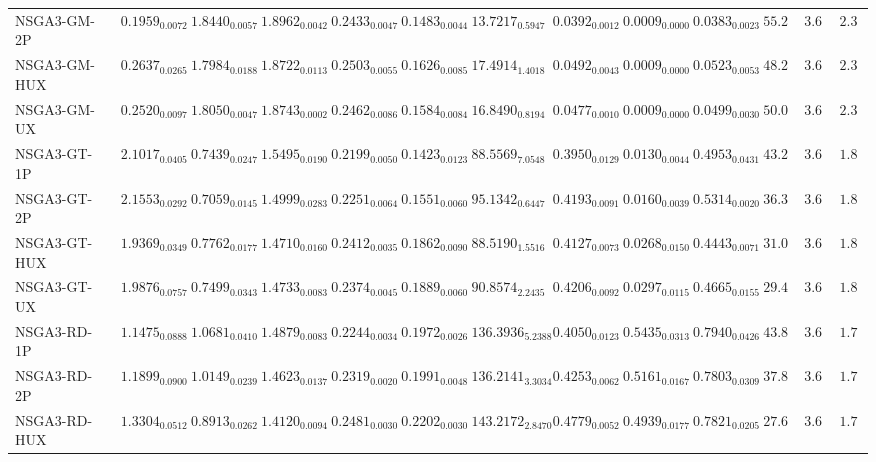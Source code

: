 \documentclass[11pt,a4paper]{article}
\begin{document}
\begin{table}[H]
{\begin{tabular}{lcccccccccccc}
NSGA3-GM-2P & $0.1959_{0.0072}$ & $1.8440_{0.0057}$ & $1.8962_{0.0042}$ & $0.2433_{0.0047}$ & $0.1483_{0.0044}$ & $13.7217_{0.5947}$ & $0.0392_{0.0012}$ & $0.0009_{0.0000}$ & $0.0383_{0.0023}$ & $55.22$ & $3.67$ & $2.33$ \\
NSGA3-GM-HUX & $0.2637_{0.0265}$ & $1.7984_{0.0188}$ & $1.8722_{0.0113}$ & $0.2503_{0.0055}$ & $0.1626_{0.0085}$ & $17.4914_{1.4018}$ & $0.0492_{0.0043}$ & $0.0009_{0.0000}$ & $0.0523_{0.0053}$ & $48.22$ & $3.67$ & $2.33$ \\
NSGA3-GM-UX & $0.2520_{0.0097}$ & $1.8050_{0.0047}$ & $1.8743_{0.0002}$ & $0.2462_{0.0086}$ & $0.1584_{0.0084}$ & $16.8490_{0.8194}$ & $0.0477_{0.0010}$ & $0.0009_{0.0000}$ & $0.0499_{0.0030}$ & $50.00$ & $3.67$ & $2.33$ \\
NSGA3-GT-1P & $2.1017_{0.0405}$ & $0.7439_{0.0247}$ & $1.5495_{0.0190}$ & $0.2199_{0.0050}$ & $0.1423_{0.0123}$ & $88.5569_{7.0548}$ & $0.3950_{0.0129}$ & $0.0130_{0.0044}$ & $0.4953_{0.0431}$ & $43.22$ & $3.67$ & $1.89$ \\
NSGA3-GT-2P & $2.1553_{0.0292}$ & $0.7059_{0.0145}$ & $1.4999_{0.0283}$ & $0.2251_{0.0064}$ & $0.1551_{0.0060}$ & $95.1342_{0.6447}$ & $0.4193_{0.0091}$ & $0.0160_{0.0039}$ & $0.5314_{0.0020}$ & $36.33$ & $3.67$ & $1.89$ \\
NSGA3-GT-HUX & $1.9369_{0.0349}$ & $0.7762_{0.0177}$ & $1.4710_{0.0160}$ & $0.2412_{0.0035}$ & $0.1862_{0.0090}$ & $88.5190_{1.5516}$ & $0.4127_{0.0073}$ & $0.0268_{0.0150}$ & $0.4443_{0.0071}$ & $31.00$ & $3.67$ & $1.89$ \\
NSGA3-GT-UX & $1.9876_{0.0757}$ & $0.7499_{0.0343}$ & $1.4733_{0.0083}$ & $0.2374_{0.0045}$ & $0.1889_{0.0060}$ & $90.8574_{2.2435}$ & $0.4206_{0.0092}$ & $0.0297_{0.0115}$ & $0.4665_{0.0155}$ & $29.44$ & $3.67$ & $1.89$ \\
NSGA3-RD-1P & $1.1475_{0.0888}$ & $1.0681_{0.0410}$ & $1.4879_{0.0083}$ & $0.2244_{0.0034}$ & $0.1972_{0.0026}$ & $136.3936_{5.2388}$ & $0.4050_{0.0123}$ & $0.5435_{0.0313}$ & $0.7940_{0.0426}$ & $43.89$ & $3.67$ & $\mathbf{1.78}$ \\
NSGA3-RD-2P & $1.1899_{0.0900}$ & $1.0149_{0.0239}$ & $1.4623_{0.0137}$ & $0.2319_{0.0020}$ & $0.1991_{0.0048}$ & $136.2141_{3.3034}$ & $0.4253_{0.0062}$ & $0.5161_{0.0167}$ & $0.7803_{0.0309}$ & $37.89$ & $3.67$ & $\mathbf{1.78}$ \\
NSGA3-RD-HUX & $1.3304_{0.0512}$ & $0.8913_{0.0262}$ & $\mathbf{1.4120}_{0.0094}$ & $0.2481_{0.0030}$ & $0.2202_{0.0030}$ & $\mathbf{143.2172}_{2.8470}$ & $0.4779_{0.0052}$ & $0.4939_{0.0177}$ & $0.7821_{0.0205}$ & $27.67$ & $3.67$ & $\mathbf{1.78}$ \\

\end{tabular}}
\end{table}
\end{document}
